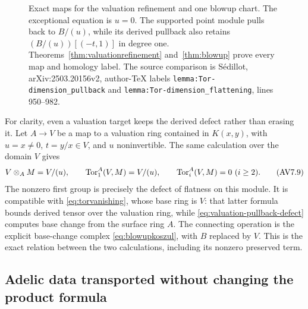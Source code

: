 \documentclass[11pt,a4paper]{article}
\theoremstyle{definition}\newtheorem{definition}[theorem]{Definition}
\begin{document}
\begin{figure}[ht]
\centering
{}
\caption{Exact maps for the valuation refinement and one blowup chart.
The exceptional equation is $u=0$. The supported point module pulls
back to $B/(u)$, while its derived pullback also retains
$(B/(u))[(-t,1)]$ in degree one. Theorems~\ref{thm:valuationrefinement}
and~\ref{thm:blowup} prove every map and homology label. The source
comparison is S\'edillot, arXiv:2503.20156v2, author-TeX labels
\nolinkurl{lemma:Tor-dimension_pullback} and
\nolinkurl{lemma:Tor-dimension_flattening}, lines 950--982.}
\end{figure}

For clarity, even a valuation target keeps the derived defect rather
than erasing it. Let $A\to V$ be a map to a valuation ring contained in
$K(x,y)$, with $u=x\ne0$, $t=y/x\in V$, and $u$ noninvertible. The same
calculation over the domain $V$ gives
\[
 V\otimes_A M=V/(u),\qquad
 \operatorname{Tor}_1^A(V,M)=V/(u),\qquad \operatorname{Tor}_i^A(V,M)=0\ (i\ge2).
 \tag{AV7.9}\label{eq:valuation-pullback-defect}
\]
The nonzero first group is precisely the defect of flatness on this
module. It is compatible with \eqref{eq:torvanishing}, whose base ring
is $V$: that latter formula bounds derived tensor over the valuation
ring, while \eqref{eq:valuation-pullback-defect} computes base change
from the surface ring $A$. The connecting operation is the explicit
base-change complex \eqref{eq:blowupkoszul}, with $B$ replaced by $V$.
This is the exact relation between the two calculations, including its
nonzero preserved term.

\subsection{Adelic data transported without changing the product formula}
\end{document}
